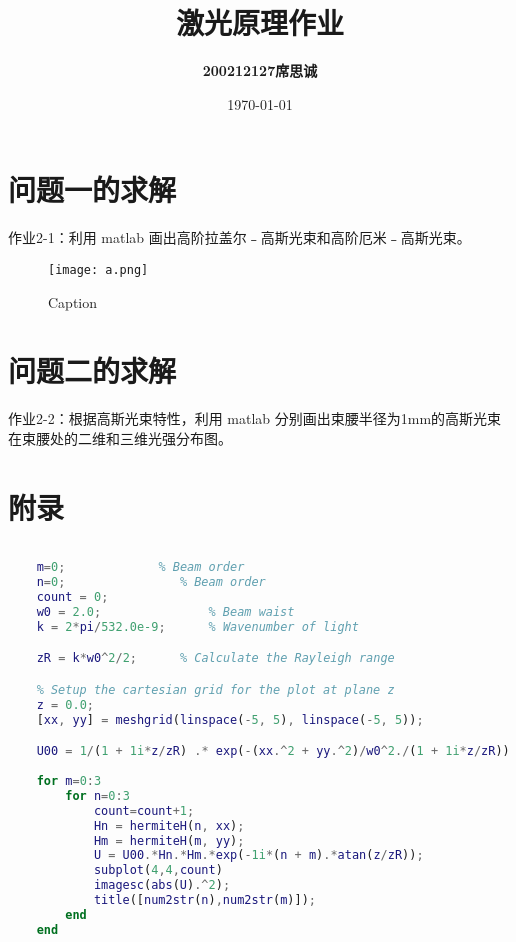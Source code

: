 \documentclass[utf8]{ctexart} %
\title{\textbf{激光原理作业}}
\author{\bf 200212127席思诚}
\date{\today}
\begin{document}
  
		\maketitle
		
        \section{问题一的求解}
        作业2-1：利用 matlab 画出高阶拉盖尔﹣高斯光束和高阶厄米﹣高斯光束。
        \begin{figure}[htbp]
            \centering
            \texttt{[image: a.png]}
            \caption{Caption}
            \label{fig:my_label}
        \end{figure}
        \section{问题二的求解}
        作业2-2：根据高斯光束特性，利用 matlab 分别画出束腰半径为1mm的高斯光束在束腰处的二维和三维光强分布图。
        \newpage
        \section*{附录}

        \begin{lstlisting}[language=matlab]
        
    m=0;             % Beam order
    n=0;                % Beam order
    count = 0;
    w0 = 2.0;               % Beam waist
    k = 2*pi/532.0e-9;      % Wavenumber of light

    zR = k*w0^2/2;      % Calculate the Rayleigh range

    % Setup the cartesian grid for the plot at plane z
    z = 0.0;
    [xx, yy] = meshgrid(linspace(-5, 5), linspace(-5, 5));

    U00 = 1/(1 + 1i*z/zR) .* exp(-(xx.^2 + yy.^2)/w0^2./(1 + 1i*z/zR));
 
    for m=0:3
        for n=0:3
            count=count+1;
            Hn = hermiteH(n, xx);
            Hm = hermiteH(m, yy);
            U = U00.*Hn.*Hm.*exp(-1i*(n + m).*atan(z/zR));
            subplot(4,4,count)
            imagesc(abs(U).^2);
            title([num2str(n),num2str(m)]);
        end
    end
    
   
    

        \end{lstlisting}
\end{document}
